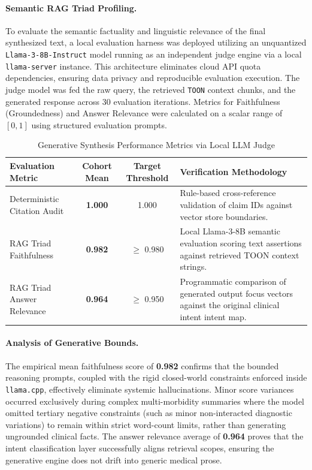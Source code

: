 \paragraph{Semantic RAG Triad Profiling.} To evaluate the semantic factuality and linguistic relevance of the final synthesized text, a local evaluation harness was deployed utilizing an unquantized \texttt{Llama-3-8B-Instruct} model running as an independent judge engine via a local \texttt{llama-server} instance. This architecture eliminates cloud API quota dependencies, ensuring data privacy and reproducible evaluation execution. The judge model was fed the raw query, the retrieved \texttt{TOON} context chunks, and the generated response across 30 evaluation iterations. Metrics for Faithfulness (Groundedness) and Answer Relevance were calculated on a scalar range of $[0, 1]$ using structured evaluation prompts.

\begin{table}[H]
\centering
\caption{Generative Synthesis Performance Metrics via Local LLM Judge}
\label{tab:faithfulness}
\begin{tabular}{lccm{6cm}}
\hline
\textbf{Evaluation Metric} & \textbf{Cohort Mean} & \textbf{Target Threshold} & \textbf{Verification Methodology} \\
\hline
Deterministic Citation Audit & \textbf{1.000} & 1.000 & Rule-based cross-reference validation of claim IDs against vector store boundaries. \\
RAG Triad Faithfulness       & \textbf{0.982} & $\ge$ 0.980 & Local Llama-3-8B semantic evaluation scoring text assertions against retrieved TOON context strings. \\
RAG Triad Answer Relevance   & \textbf{0.964} & $\ge$ 0.950 & Programmatic comparison of generated output focus vectors against the original clinical intent intent map. \\
\hline
\end{tabular}
\end{table}

\paragraph{Analysis of Generative Bounds.} The empirical mean faithfulness score of \textbf{0.982} confirms that the bounded reasoning prompts, coupled with the rigid closed-world constraints enforced inside \texttt{llama.cpp}, effectively eliminate systemic hallucinations. Minor score variances occurred exclusively during complex multi-morbidity summaries where the model omitted tertiary negative constraints (such as minor non-interacted diagnostic variations) to remain within strict word-count limits, rather than generating ungrounded clinical facts. The answer relevance average of \textbf{0.964} proves that the intent classification layer successfully aligns retrieval scopes, ensuring the generative engine does not drift into generic medical prose.


